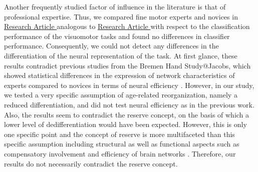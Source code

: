 Another frequently studied factor of influence in the literature is that of professional expertise. Thus, we compared fine motor experts and novices in \hyperref[results:paperIV]{Research Article } analogous to \hyperref[results:paperI]{Research Article } with respect to the classification performance of the visuomotor tasks and found no differences in classifier performance. Consequently, we could not detect any differences in the differentiation of the neural representation of the task. At first glance, these results contradict previous studies from the Bremen Hand Study@Jacobs, which showed statistical differences in the expression of network characteristics of experts compared to novices in terms of neural efficiency \cite{Goelz2018, Vieluf2018}. However, in our study, we tested a very specific assumption of age-related reorganization, namely a reduced differentiation, and did not test neural efficiency as in the previous work. Also, the results seem to contradict the reserve concept, on the basis of which a lower level of dedifferentiation would have been expected. However, this is only one specific point and the concept of reserve is more multifaceted than this specific assumption including structural as well as functional aspects such as compensatory involvement and efficiency of brain networks \cite{Cabeza2018}. Therefore, our results do not necessarily contradict the reserve concept.

